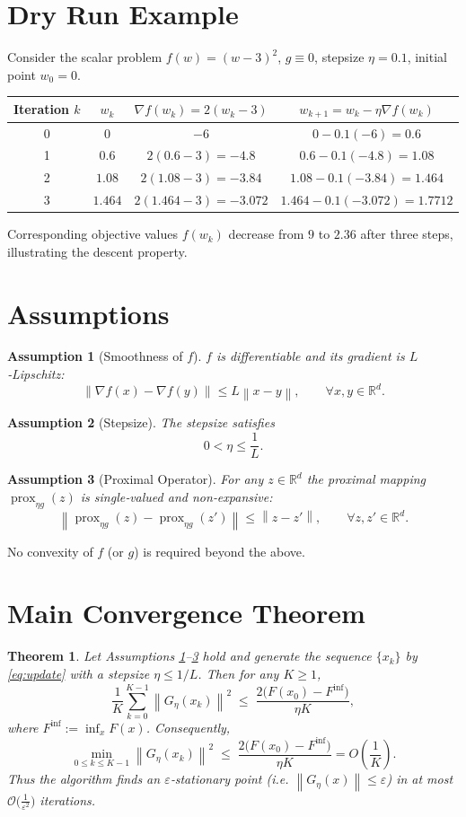 \documentclass{article}
\newtheorem{theorem}{Theorem}
\newtheorem{assumption}{Assumption}
\newcommand{\prox}{\operatorname{prox}}
\newcommand{\grad}{\nabla}
\newcommand{\norm}[1]{\left\lVert #1\right\rVert}
\newcommand{\R}{\mathbb{R}}
\begin{document}
\section*{Dry Run Example}
Consider the scalar problem $f(w)=(w-3)^{2}$, $g\equiv0$, stepsize $\eta=0.1$, initial point $w_{0}=0$.

\begin{center}
\begin{tabular}{c|c|c|c}
Iteration $k$ & $w_{k}$ & $\grad f(w_{k})=2(w_{k}-3)$ & $w_{k+1}=w_{k}-\eta\grad f(w_{k})$\\\hline
0 & $0$ & $-6$ & $0-0.1(-6)=0.6$\\
1 & $0.6$ & $2(0.6-3)=-4.8$ & $0.6-0.1(-4.8)=1.08$\\
2 & $1.08$ & $2(1.08-3)=-3.84$ & $1.08-0.1(-3.84)=1.464$\\
3 & $1.464$ & $2(1.464-3)=-3.072$ & $1.464-0.1(-3.072)=1.7712$
\end{tabular}
\end{center}
Corresponding objective values $f(w_{k})$ decrease from $9$ to $2.36$ after three steps, illustrating the descent property.

\section*{Assumptions}
\begin{assumption}[Smoothness of $f$]\label{ass:smooth}
$f$ is differentiable and its gradient is $L$‑Lipschitz:
\[
\norm{\grad f(x)-\grad f(y)}\le L\norm{x-y},\qquad\forall x,y\in\R^{d}.
\]
\end{assumption}
\begin{assumption}[Stepsize]\label{ass:stepsize}
The stepsize satisfies
\[
0<\eta\le\frac{1}{L}.
\]
\end{assumption}
\begin{assumption}[Proximal Operator]\label{ass:prox}
For any $z\in\R^{d}$ the proximal mapping $\prox_{\eta g}(z)$ is single‑valued and \emph{non‑expansive}:
\[
\norm{\prox_{\eta g}(z)-\prox_{\eta g}(z')}\le\norm{z-z'},\qquad\forall z,z'\in\R^{d}.
\]
\end{assumption}
No convexity of $f$ (or $g$) is required beyond the above.

\section*{Main Convergence Theorem}
\begin{theorem}\label{thm:main}
Let Assumptions \ref{ass:smooth}–\ref{ass:prox} hold and generate the sequence $\{x_{k}\}$ by \eqref{eq:update} with a stepsize $\eta\le1/L$. Then for any $K\ge1$,
\[
\frac{1}{K}\sum_{k=0}^{K-1}\norm{G_{\eta}(x_{k})}^{2}
\;\le\;
\frac{2\bigl(F(x_{0})-F^{\inf}\bigr)}{\eta K},
\tag{1}
\]
where $F^{\inf}:=\inf_{x}F(x)$.
Consequently,
\[
\min_{0\le k\le K-1}\norm{G_{\eta}(x_{k})}^{2}
\;\le\;
\frac{2\bigl(F(x_{0})-F^{\inf}\bigr)}{\eta K}
=O\!\left(\frac{1}{K}\right).
\]
Thus the algorithm finds an $\varepsilon$‑stationary point (i.e. $\norm{G_{\eta}(x)}\le\varepsilon$) in at most $\mathcal{O}\!\bigl(\tfrac{1}{\varepsilon^{2}}\bigr)$ iterations.
\end{theorem}
\end{document}
